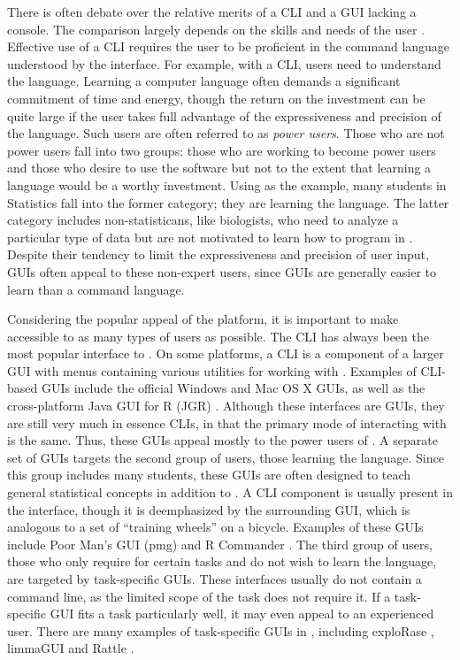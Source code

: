 \documentclass[article]{jss}
\begin{document}
There is often debate over the relative merits of a CLI and a GUI lacking a console. 
The comparison largely
depends on the skills and needs of the user \citep{gui-cli}. Effective use of a
CLI requires the user to be proficient in the command language understood by the
interface. For example, with a CLI,  users need to understand the 
 language. Learning a computer language often demands a significant
commitment of time and energy, though the return on the investment can be quite
large if the user takes full advantage of the expressiveness and precision of 
the language. Such users are often referred to as \emph{power users}. Those who 
are not power users fall into two groups: those who are working to become power
users and those who desire to use the software but not to the extent that learning a
language would be a worthy investment. Using
 as the example, many students in Statistics fall into the former 
category; they are learning the  language. The latter category includes 
non-statisticans, like biologists, who need to analyze a particular
type of data but are not motivated to learn how to program in . 
Despite their tendency to limit the expressiveness and precision of user input, 
GUIs often appeal to these non-expert users, since GUIs are generally easier
to learn than a command language.

Considering the popular appeal of the  platform,
it is important to make  accessible to as many types of users as possible.
The CLI has always been the most popular interface to . 
On some platforms, a CLI is a component of a larger 
GUI with menus containing various utilities for working
with . Examples of CLI-based  GUIs include the official
Windows and Mac OS X GUIs, as well as the cross-platform 
Java GUI for R (JGR) \citep{JGR}. Although these interfaces are GUIs, they are 
still very much in essence CLIs, in that the primary mode of interacting with 
 is the same. Thus, these GUIs appeal mostly to the power users of .
A separate set of GUIs targets the second group of users, those learning the 
 language. Since this group includes many students, these GUIs are
often designed to teach general statistical concepts in addition to .
A CLI component is usually present in the interface, though it is
deemphasized by the surrounding GUI, which is analogous to a set of 
``training wheels'' on a bicycle. Examples of these GUIs include 
Poor Man's GUI (pmg) \citep{pmg} and R Commander \citep{rcmndr}. The third 
group of users, those who only require  for certain tasks and 
do not wish to learn the language, are targeted by task-specific GUIs. These 
interfaces usually do not contain a command line, as the limited scope of the
task does not require it. If a task-specific GUI fits a task particularly well,
it may even appeal to an experienced user. There are many examples of 
task-specific GUIs in , including
exploRase \citep{explorase}, limmaGUI \citep{limma} and Rattle \citep{rattle}.
\end{document}
